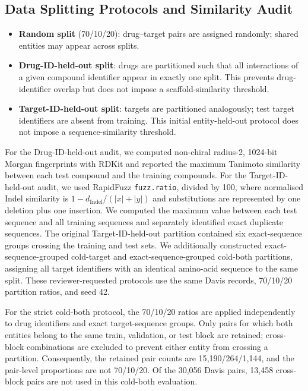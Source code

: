 \documentclass[fleqn,10pt]{wlscirep}
\begin{document}
\subsection{Data Splitting Protocols and Similarity Audit}

\begin{itemize}[leftmargin=*]
\item \textbf{Random split} (70/10/20): drug--target pairs are assigned randomly;
  shared entities may appear across splits.
\item \textbf{Drug-ID-held-out split}: drugs are partitioned such that all interactions
  of a given compound identifier appear in exactly one split.  This prevents
  drug-identifier overlap but does not impose a scaffold-similarity threshold.
\item \textbf{Target-ID-held-out split}: targets are partitioned analogously; test
  target identifiers are absent from training.  This initial entity-held-out
  protocol does not impose a sequence-similarity threshold.
\end{itemize}

For the Drug-ID-held-out audit, we computed non-chiral radius-2, 1024-bit Morgan
fingerprints with RDKit and
reported the maximum Tanimoto similarity between each test compound and the
training compounds. For the Target-ID-held-out audit, we used RapidFuzz
\texttt{fuzz.ratio}, divided by 100, where normalised Indel similarity is
$1-d_\mathrm{Indel}/(|x|+|y|)$ and substitutions are represented by one
deletion plus one insertion. We computed the maximum value between each test
sequence and all training sequences and separately identified exact duplicate
sequences. The original
Target-ID-held-out partition contained six exact-sequence groups crossing the
training and test sets. We additionally constructed exact-sequence-grouped cold-target
and exact-sequence-grouped cold-both partitions, assigning all target identifiers with an identical
amino-acid sequence to the same split.  These reviewer-requested protocols use
the same Davis records, 70/10/20 partition ratios, and seed 42.

For the strict cold-both protocol, the 70/10/20 ratios are applied independently
to drug identifiers and exact target-sequence groups. Only pairs for which both
entities belong to the same train, validation, or test block are retained;
cross-block combinations are excluded to prevent either entity from crossing a
partition. Consequently, the retained pair counts are 15{,}190/264/1{,}144,
and the pair-level proportions are not 70/10/20. Of the 30{,}056 Davis pairs,
13{,}458 cross-block pairs are not used in this cold-both evaluation.
\end{document}
